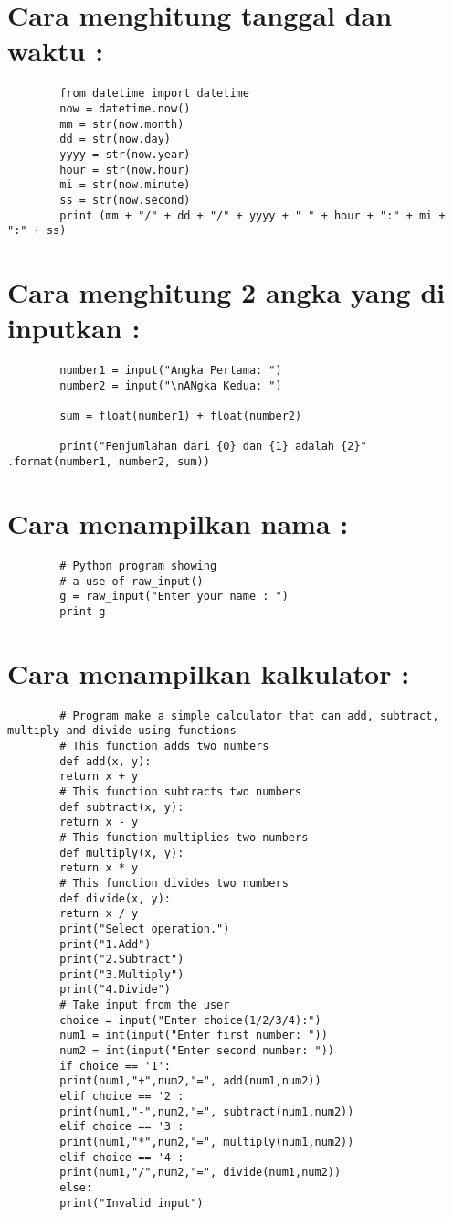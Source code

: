 \documentclass{article}
\begin{document}
	\section {Cara menghitung tanggal dan waktu :}
	\begin{lstlisting}
		from datetime import datetime
		now = datetime.now()
		mm = str(now.month)
		dd = str(now.day)
		yyyy = str(now.year)
		hour = str(now.hour)
		mi = str(now.minute)
		ss = str(now.second)
		print (mm + "/" + dd + "/" + yyyy + " " + hour + ":" + mi + ":" + ss)
	\end{lstlisting}

	\section {Cara menghitung 2 angka yang di inputkan :}
	\begin{lstlisting}
		number1 = input("Angka Pertama: ")
		number2 = input("\nANgka Kedua: ")
		
		sum = float(number1) + float(number2)
		
		print("Penjumlahan dari {0} dan {1} adalah {2}" .format(number1, number2, sum)) 
	\end{lstlisting}

	\section {Cara  menampilkan nama :}
	\begin{lstlisting}
		# Python program showing
		# a use of raw_input()
		g = raw_input("Enter your name : ")
		print g 
	\end{lstlisting}

	\section {Cara  menampilkan kalkulator :}
	\begin{lstlisting}
		# Program make a simple calculator that can add, subtract, multiply and divide using functions
		# This function adds two numbers
		def add(x, y):
		return x + y
		# This function subtracts two numbers
		def subtract(x, y):
		return x - y
		# This function multiplies two numbers
		def multiply(x, y):
		return x * y
		# This function divides two numbers
		def divide(x, y):
		return x / y
		print("Select operation.")
		print("1.Add")
		print("2.Subtract")
		print("3.Multiply")
		print("4.Divide")
		# Take input from the user
		choice = input("Enter choice(1/2/3/4):")
		num1 = int(input("Enter first number: "))
		num2 = int(input("Enter second number: "))
		if choice == '1':
		print(num1,"+",num2,"=", add(num1,num2))
		elif choice == '2':
		print(num1,"-",num2,"=", subtract(num1,num2))
		elif choice == '3':
		print(num1,"*",num2,"=", multiply(num1,num2))
		elif choice == '4':
		print(num1,"/",num2,"=", divide(num1,num2))
		else:
		print("Invalid input")
	\end{lstlisting}
\end{document}
